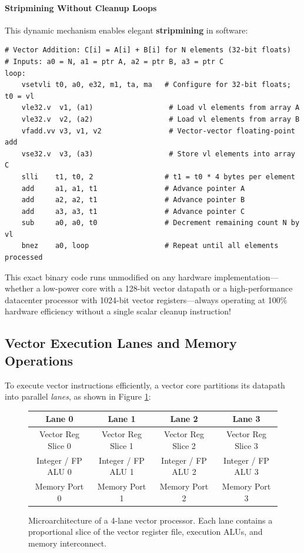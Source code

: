 \paragraph{Stripmining Without Cleanup Loops}
This dynamic mechanism enables elegant \textbf{stripmining} in software:
\begin{verbatim}
# Vector Addition: C[i] = A[i] + B[i] for N elements (32-bit floats)
# Inputs: a0 = N, a1 = ptr A, a2 = ptr B, a3 = ptr C
loop:
    vsetvli t0, a0, e32, m1, ta, ma   # Configure for 32-bit floats; t0 = vl
    vle32.v  v1, (a1)                  # Load vl elements from array A
    vle32.v  v2, (a2)                  # Load vl elements from array B
    vfadd.vv v3, v1, v2                # Vector-vector floating-point add
    vse32.v  v3, (a3)                  # Store vl elements into array C
    slli    t1, t0, 2                 # t1 = t0 * 4 bytes per element
    add     a1, a1, t1                # Advance pointer A
    add     a2, a2, t1                # Advance pointer B
    add     a3, a3, t1                # Advance pointer C
    sub     a0, a0, t0                # Decrement remaining count N by vl
    bnez    a0, loop                  # Repeat until all elements processed
\end{verbatim}
This exact binary code runs unmodified on any hardware implementation—whether a low-power core with a 128-bit vector datapath or a high-performance datacenter processor with 1024-bit vector registers—always operating at 100\% hardware efficiency without a single scalar cleanup instruction!

\subsection{Vector Execution Lanes and Memory Operations}
To execute vector instructions efficiently, a vector core partitions its datapath into parallel \textit{lanes}, as shown in Figure \ref{fig:vector_lanes}:
\begin{figure}[htbp]
  \begin{center}
    \small
    \begin{tabular}{|c|c|c|c|}
      \hline
      \textbf{Lane 0} & \textbf{Lane 1} & \textbf{Lane 2} & \textbf{Lane 3} \\ \hline
      Vector Reg Slice 0 & Vector Reg Slice 1 & Vector Reg Slice 2 & Vector Reg Slice 3 \\ \hline
      Integer / FP ALU 0 & Integer / FP ALU 1 & Integer / FP ALU 2 & Integer / FP ALU 3 \\ \hline
      Memory Port 0 & Memory Port 1 & Memory Port 2 & Memory Port 3 \\ \hline
    \end{tabular}
    \caption{Microarchitecture of a 4-lane vector processor. Each lane contains a proportional slice of the vector register file, execution ALUs, and memory interconnect.}
    \label{fig:vector_lanes}
  \end{center}
\end{figure}

